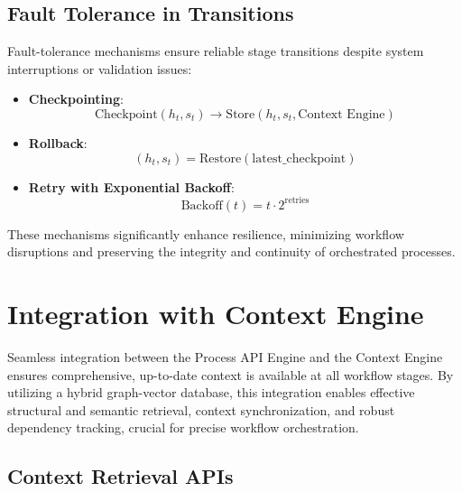 \documentclass[11pt,a4paper]{article}
\begin{document}
\subsection{Fault Tolerance in Transitions}
\label{subsec:fault_tolerance_transitions}

Fault-tolerance mechanisms ensure reliable stage transitions despite system interruptions or validation issues:

\begin{itemize}
    \item \textbf{Checkpointing}:
    \[
    \text{Checkpoint}(h_t, s_t)\rightarrow\text{Store}(h_t, s_t,\text{Context Engine})
    \]

    \item \textbf{Rollback}:
    \[
    (h_t, s_t) = \text{Restore}(\text{latest\_checkpoint})
    \]

    \item \textbf{Retry with Exponential Backoff}:
    \[
    \text{Backoff}(t) = t\cdot2^{\text{retries}}
    \]
\end{itemize}

These mechanisms significantly enhance resilience, minimizing workflow disruptions and preserving the integrity and continuity of orchestrated processes.

\section{Integration with Context Engine}
\label{sec:integration}

Seamless integration between the Process API Engine and the Context Engine ensures comprehensive, up-to-date context is available at all workflow stages. By utilizing a hybrid graph-vector database, this integration enables effective structural and semantic retrieval, context synchronization, and robust dependency tracking, crucial for precise workflow orchestration.

\subsection{Context Retrieval APIs}
\label{subsec:context_retrieval}
\end{document}
